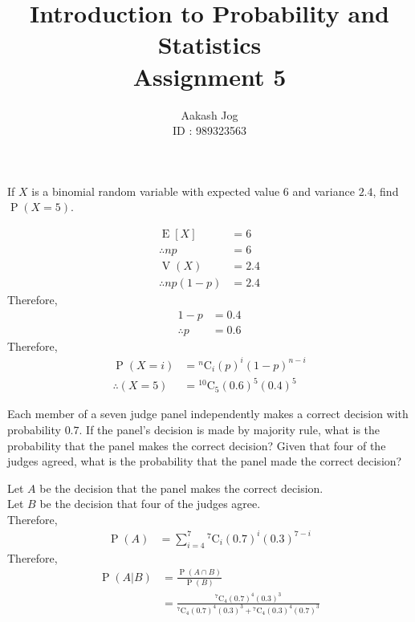 \documentclass[fleqn, a4paper, 11pt, oneside]{amsart}
\title
[
	Introduction to Probability and Statistics : Assignment 5
]
{
	Introduction to Probability and Statistics\\
	Assignment 5
}
\author
{
	Aakash Jog\\
	ID : 989323563
}
\date{\formatdate{13}{3}{2016}}
\theoremstyle{definition}
\theoremstyle{theorem}
\DeclareMathOperator{\prob}{\mathrm{P}}
\DeclareMathOperator{\expct}{\mathrm{E}}
\DeclareMathOperator{\var}{\mathrm{V}}
\newcommand*{\comb}[2]{{}^{#1}\mathrm{C}_{#2}}%
\begin{document}
\maketitle

\begin{question}
	If $X$ is a binomial random variable with expected value $6$ and variance $2.4$, find $\prob(X = 5)$.
\end{question}

\begin{solution}
	\begin{align*}
		\expct[X] &= 6\\
		\therefore n p &= 6\\
		\var(X) &= 2.4\\
		\therefore n p (1 - p) &= 2.4
	\end{align*}
	Therefore,
	\begin{align*}
		1 - p &= 0.4\\
		\therefore p &= 0.6
	\end{align*}
	Therefore,
	\begin{align*}
		\prob(X = i) &= \comb{n}{i} (p)^i (1 - p)^{n - i}\\
		\therefore (X = 5) &= \comb{10}{5} (0.6)^5 (0.4)^5
	\end{align*}
\end{solution}

\begin{question}
	Each member of a seven judge panel independently makes a correct decision with probability $0.7$.
	If the panel's decision is made by majority rule, what is the probability that the panel makes the correct decision?
	Given that four of the judges agreed, what is the probability that the panel made the correct decision?
\end{question}

\begin{solution}
	Let $A$ be the decision that the panel makes the correct decision.\\
	Let $B$ be the decision that four of the judges agree.\\
	Therefore,
	\begin{align*}
		\prob(A) &= \sum\limits_{i = 4}^{7} \comb{7}{i} (0.7)^i (0.3)^{7 - i}
	\end{align*}
	Therefore,
	\begin{align*}
		\prob(A|B) &= \frac{\prob(A \cap B)}{\prob(B)}\\
		&= \frac{\comb{7}{4} (0.7)^4 (0.3)^3}{\comb{7}{4} (0.7)^4 (0.3)^3 + \comb{7}{4} (0.3)^4 (0.7)^3}
	\end{align*}
\end{solution}
\end{document}
